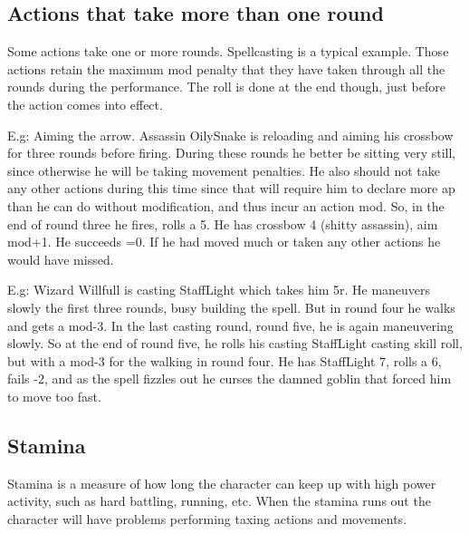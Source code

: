 \subsection*{Actions that take more than one round}
\label{multiroundactions}
Some actions take one or more rounds. Spellcasting is a typical example. Those actions retain the maximum mod penalty that they have taken through all the rounds during the performance. The roll is done at the end though, just before the action comes into effect.

E.g: Aiming the arrow. Assassin OilySnake is reloading and aiming his crossbow for three rounds before firing. During these rounds he better be sitting very still, since otherwise he will be taking movement penalties. He also should not take any other actions during this time since that will require him to declare more ap than he can do without modification, and thus incur an action mod. So, in the end of round three he fires, rolls a 5. He has crossbow 4 (shitty assassin), aim mod+1. He succeeds =0. If he had moved much or taken any other actions he would have missed.

E.g: Wizard Willfull is casting StaffLight which takes him 5r. He maneuvers slowly the first three rounds, busy building the spell. But in round four he walks and gets a mod-3. In the last casting round, round five, he is again maneuvering slowly. So at the end of round five, he rolls his casting StaffLight casting skill roll, but with a mod-3 for the walking in round four. He has StaffLight 7, rolls a 6, fails -2, and as the spell fizzles out he curses the damned goblin that forced him to move too fast.
















\subsection*{Stamina}
Stamina is a measure of how long the character can keep up with high power activity, such as hard battling, running, etc. When the stamina runs out the character will have problems performing taxing actions and movements.

